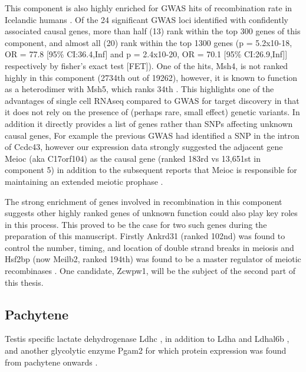 This component is also highly enriched for GWAS hits of recombination rate in Icelandic humans \cite{Halldorsson2019Characterizing}. Of the 24 significant GWAS loci identified with confidently associated causal genes, more than half (13) rank within the top 300 genes of this component, and almost all (20) rank within the top 1300 genes (p = 5.2x10-18, OR = 77.8 [95\% CI:36.4,Inf] and p = 2.4x10-20, OR = 70.1 [95\% CI:26.9,Inf]] respectively by fisher's exact test [FET]). One of the hits, Msh4, is not ranked highly in this component (2734th out of 19262), however, it is known to function as a heterodimer with Msh5, which ranks 34th \cite{Rakshambikai2013Structural}. This highlights one of the advantages of single cell RNAseq compared to GWAS for target discovery in that it does not rely on the presence of (perhaps rare, small effect) genetic variants. In addition it directly provides a list of genes rather than SNPs affecting unknown causal genes, For example the previous GWAS had identified a SNP in the intron of Ccdc43, however our expression data strongly suggested the adjacent gene Meioc (aka C17orf104) as the causal gene (ranked 183rd vs 13,651st in component 5) in addition to the subsequent reports that Meioc is responsible for maintaining an extended meiotic prophase \cite{Abby2016Implementation, Kong2014Common, Soh2017Meioc}. 

The strong enrichment of genes involved in recombination in this component suggests other highly ranked genes of unknown function could also play key roles in this process. This proved to be the case for two such genes during the preparation of this manuscript. Firstly Ankrd31 (ranked 102nd) was found to control the number, timing, and location of double strand breaks in meiosis \cite{Boekhout2018REC114, Papanikos2018ANKRD31} and Hsf2bp (now Meilb2, ranked 194th) was found to be a master regulator of meiotic recombinases \cite{Zhang2019meiosisspecific}. One candidate, Zcwpw1, will be the subject of the second part of this thesis.


\subsection{Pachytene}

Testis specific lactate dehydrogenase Ldhc \parencite{Goldberg1963Lactic, Blanco1963Lactate, Goldberg2010LDHC}, in addition to Ldha and Ldhal6b \parencite{Wang2005Cloning}, and another glycolytic enzyme Pgam2 for which protein expression was found from pachytene onwards \parencite{Fundele1987Developmental}.

